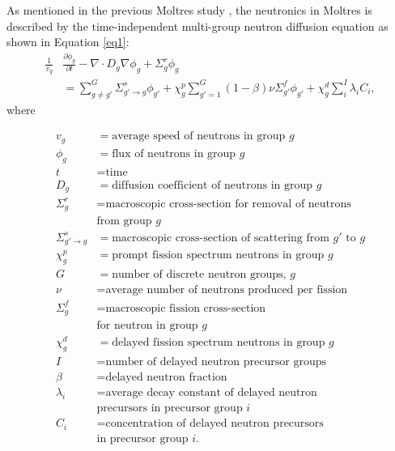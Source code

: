 \documentclass{anstrans}
\begin{document}
	As mentioned in the previous Moltres study
	\cite{lindsay_introduction_2018}, the neutronics in Moltres is described by
	the time-independent multi-group neutron diffusion equation as shown in
	Equation \ref{eq1}:
%
\begin{align}
	\frac{1}{v_g} &\frac{\partial \phi_g}{\partial t} - \nabla \cdot D_g \nabla
	\phi_g + \Sigma^r_g \phi_g \nonumber \\ 
	&= \sum^G_{g \neq g'} \Sigma^s_{g' \rightarrow g} \phi_{g'} + \chi^p_g
	\sum^G_{g'=1} (1-\beta) \nu \Sigma^f_{g'} \phi_{g'} + \chi^d_g \sum^I_i
	\lambda_i C_i, \label{eq1}
\end{align}
%
	where

{
\small
\begin{align}
	v_g &= \text{average speed of neutrons in group }g \\
	\phi_g &= \text{flux of neutrons in group }g \\
	t &= \text{time} \\
	D_g &= \text{diffusion coefficient of neutrons in group }g \\
	\Sigma^r_g &= \text{macroscopic cross-section for removal of neutrons} 
	\nonumber \\
	&\text{from group }g \\
	\Sigma^s_{g' \rightarrow g} &= \text{macroscopic cross-section of
	scattering from }g' \text{ to }g \\
	\chi^p_g &= \text{prompt fission spectrum neutrons in group }g \\
	G &= \text{number of discrete neutron groups, }g \\
	\nu &= \text{average number of neutrons produced per fission} \\
	\Sigma^f_{g} &= \text{macroscopic fission cross-section} \nonumber \\
	&\text{for neutron in group }g \\
	\chi^d_g &= \text{delayed fission spectrum neutrons in group }g \\
	I &= \text{number of delayed neutron precursor groups} \\
	\beta &= \text{delayed neutron fraction} \\
	\lambda_i &= \text{average decay constant of delayed neutron} \nonumber \\
	&\text{precursors in precursor group }i \\
	C_i &= \text{concentration of delayed neutron precursors} \nonumber \\
	&\text{in precursor group }i .
\end{align}
}
\end{document}
